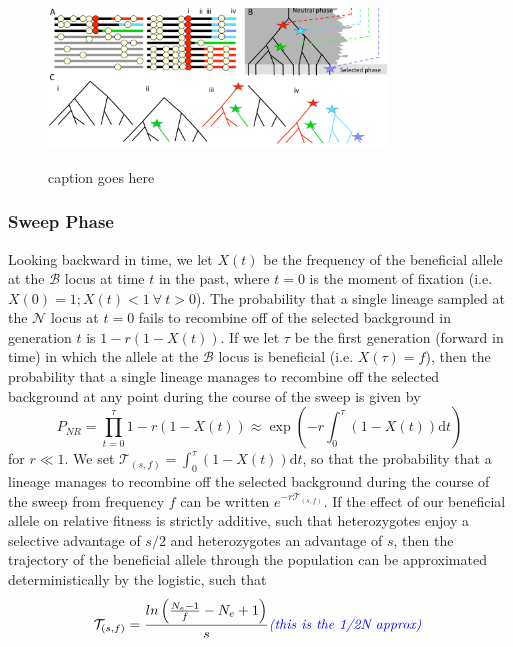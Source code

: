 \documentclass[a4paper,10pt]{article}
\newcommand{\fancyN}{$\mathcal N$ }
\newcommand{\fancyB}{$\mathcal B$ }
\newcommand{\jb}[1]{{\it\color{blue} (#1)} }
\begin{document}
\begin{figure}
	\includegraphics[width = 0.8\textwidth]{../Paper_Figures/Cartoon_of_soft_sweeps.pdf} \label{cartoon_fig_1}
	\caption{caption goes here}
\end{figure}


\subsubsection{Sweep Phase}
Looking backward in time, we let $X\left(t\right)$ be the frequency of the beneficial allele at the \fancyB locus at time $t$ in the past, where $t=0$ is the moment of fixation (i.e. $X\left(0\right) = 1; X\left(t\right) < 1\ \forall\ t > 0$). The probability that a single lineage sampled at the \fancyN locus at $t=0$ fails to recombine off of the selected background in generation $t$ is $1-r\left(1-X(t)\right)$. If we let $\tau$ be the first generation (forward in time) in which the allele at the \fancyB locus is beneficial (i.e. $X\left(\tau\right) = f$), then the probability that a single lineage manages to recombine off the selected background at any point during the course of the sweep is given by
\begin{equation}
P_{NR} = \prod_{t=0}^{\tau} 1-r\left(1-X(t)\right)  \approx \exp \left(-r \int_0^{\tau}(1-X\left(t\right))\mathrm{d} t \right)
\end{equation}
for $r \ll 1$. We set  $\mathcal{T}_{\left(s,f\right)} = \int_0^{\tau}(1-X\left(t\right))\mathrm{d}t$, so that the probability that a lineage manages to recombine off the selected background during the course of the sweep from frequency $f$ can be written $e^{-r\mathcal{T}_{\left(s,f\right)}}$. If the effect of our beneficial allele on relative fitness is strictly additive, such that heterozygotes enjoy a selective advantage of $s/2$ and heterozygotes an advantage of $s$, then the trajectory of the beneficial allele through the population can be approximated deterministically by the logistic, such that 
\begin{equation}
	\mathcal{T}_{\left(s,f\right)} = \frac{ln\left(\frac{N_e - 1}{f}-N_e + 1\right)}{s} \textrm{\jb{this is the 1/2N approx}}
\end{equation}
\end{document}
